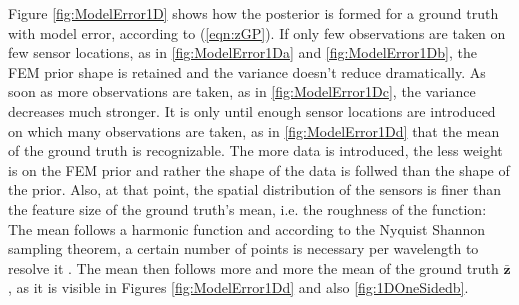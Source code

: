 \documentclass[%
  a4paper,oneside,%
  11pt,%
  smallchapters,
  style=printdev,
  extramargin,
  green,%
  rgb, <cmyk>
  ]{tubsbook}
\begin{document}
Figure \ref{fig:ModelError1D} shows how the posterior is formed for a ground truth with model error, according to (\ref{eqn:zGP}). If only few observations are taken on few sensor locations, as in \ref{fig:ModelError1Da} and \ref{fig:ModelError1Db}, the FEM prior shape is retained and the variance doesn't reduce dramatically. As soon as more observations are taken, as in \ref{fig:ModelError1Dc}, the variance decreases much stronger. It is only until enough sensor locations are introduced on which many observations are taken, as in \ref{fig:ModelError1Dd} that the mean of the ground truth is recognizable. The more data is introduced, the less weight is on the FEM prior and rather the shape of the data is follwed than the shape of the prior. Also, at that point, the spatial distribution of the sensors is finer than the feature size of the ground truth's mean, i.e. the roughness of the function: The mean follows a harmonic function and according to the Nyquist Shannon sampling theorem, a certain number of points is necessary per wavelength to resolve it \cite{Shannon1949,Marburga}. The mean then follows more and more the mean of the ground truth $\bar{\bm{z}}$, as it is visible in Figures \ref{fig:ModelError1Dd} and also \ref{fig:1DOneSidedb}. 
\end{document}
